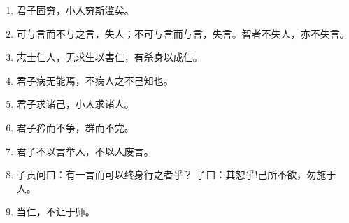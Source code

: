 \documentclass[UTF8]{ctexart}
\begin{document}
\begin{enumerate}
			\item 君子固穷，小人穷斯滥矣。
			\item 可与言而不与之言，失人；不可与言而与言，失言。智者不失人，亦不失言。
			\item 志士仁人，无求生以害仁，有杀身以成仁。
			\item 君子病无能焉，不病人之不己知也。
			\item 君子求诸己，小人求诸人。
			\item 君子矜而不争，群而不党。
			\item 君子不以言举人，不以人废言。
			\item 子贡问曰：有一言而可以终身行之者乎？ 子曰：其恕乎!己所不欲，勿施于人。
			\item 当仁，不让于师。
			
		\end{enumerate}
	
		\newpage
	
\end{document}

